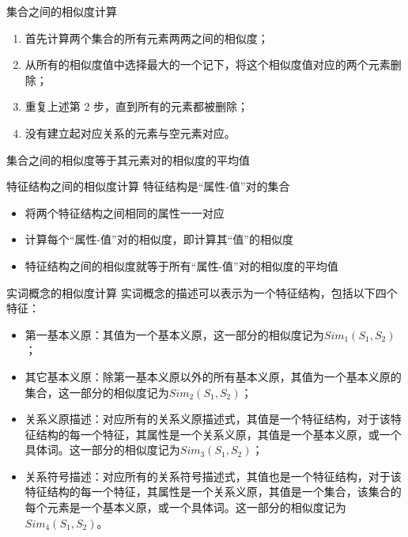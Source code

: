 \documentclass[aspectratio=169]{beamer} %
\begin{document}
    \begin{frame}{集合之间的相似度计算}
      \begin{enumerate}
        \item 首先计算两个集合的所有元素两两之间的相似度；
        \item 从所有的相似度值中选择最大的一个记下，将这个相似度值对应的两个元素删除；
        \item 重复上述第 2 步，直到所有的元素都被删除；
        \item 没有建立起对应关系的元素与空元素对应。 
      \end{enumerate}
      集合之间的相似度等于其元素对的相似度的平均值
    \end{frame}

    \begin{frame}{特征结构之间的相似度计算}
      特征结构是“属性-值”对的集合
      \begin{itemize}
        \item 将两个特征结构之间相同的属性一一对应
        \item 计算每个“属性-值”对的相似度，即计算其“值”的相似度
        \item 特征结构之间的相似度就等于所有“属性-值”对的相似度的平均值
      \end{itemize}
    \end{frame}

    \begin{frame}{实词概念的相似度计算}
      实词概念的描述可以表示为一个特征结构，包括以下四个特征：
      \begin{itemize}
        \item 第一基本义原：其值为一个基本义原，这一部分的相似度记为$Sim_1(S_1,S_2)$；
        \item 其它基本义原：除第一基本义原以外的所有基本义原，其值为一个基本义原的集合，这一部分的相似度记为$Sim_2(S_1,S_2)$；
        \item 关系义原描述：对应所有的关系义原描述式，其值是一个特征结构，对于该特征结构的每一个特征，其属性是一个关系义原，其值是一个基本义原，或一个具体词。这一部分的相似度记为$Sim_3(S_1,S_2)$；
        \item 关系符号描述：对应所有的关系符号描述式，其值也是一个特征结构，对于该特征结构的每一个特征，其属性是一个关系义原，其值是一个集合，该集合的每个元素是一个基本义原，或一个具体词。这一部分的相似度记为$Sim_4(S_1,S_2)$。 
    \end{itemize}
    \end{frame}
\end{document}
